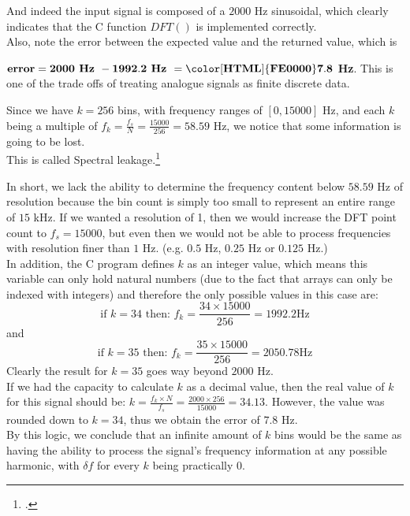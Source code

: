 And indeed the input signal is composed of a $2000$ Hz sinusoidal, which clearly indicates that the C function $DFT()$ is implemented correctly.\\

Also, note the error between the expected value and the returned value, which is

$\mathbf{error = 2000 \textbf{ Hz } - 1992.2 \textbf{ Hz } = \color[HTML]{FE0000}7.8}$ \textbf{Hz}.
This is one of the trade offs of treating analogue signals as finite discrete data.

Since we have  $k = 256$ bins, with frequency ranges of $[0, 15000]$ Hz, and each $k$ being a multiple of $f_k = \frac{f_s}{N} = \frac{15000}{256} = 58.59$ Hz, we notice that some information is going to be lost.\\

This is called Spectral leakage.\footcite{book2_pp71_80}

\newpage
In short, we lack the ability to determine the frequency content below $58.59$ Hz of resolution because the bin count is simply too small to represent an entire range of $15$ kHz. If we wanted a resolution of 1, then we would increase the DFT point count to $f_s = 15000$, but even then we would not be able to process frequencies with resolution finer than $1$ Hz. (e.g. $0.5$ Hz, $0.25$ Hz or $0.125$ Hz.)\\

In addition, the C program defines $k$ as an integer value, which means this variable can only hold natural numbers (due to the fact that arrays can only be indexed with integers) and therefore the only possible values in this case are:
\[\text{if } k=34 \text{ then: } f_k = \frac{34\times 15000}{256} = 1992.2 \text{Hz}\]
and
\[\text{if }k=35 \text{ then: } f_k = \frac{35\times 15000}{256} = 2050.78 \text{Hz}\]
Clearly the result for $k = 35$ goes way beyond $2000$ Hz.\\

If we had the capacity to calculate $k$ as a decimal value, then the real value of $k$ for this signal should be: $k = \frac{f_k\times N}{f_s} = \frac{2000\times 256}{15000} = 34.13$. However, the value was rounded down to $k = 34$, thus we obtain the error of $7.8$ Hz.\\

By this logic, we conclude that an infinite amount of $k$ bins would be the same as having the ability to process the signal's frequency information at any possible harmonic, with $\delta f$ for every $k$ being practically 0.\\

